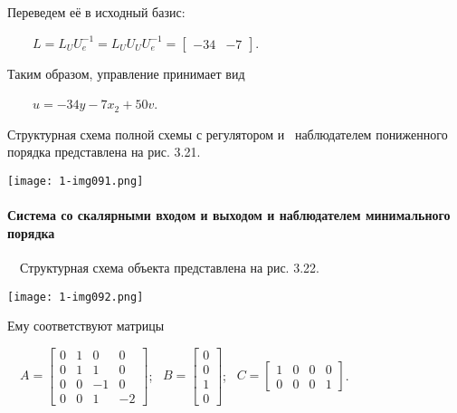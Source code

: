 \documentclass[a4paper]{article}
\begin{document}
{\begin{russian}\sffamily
Переведем её в исходный базис:
\end{russian}}

{\begin{russian}\sffamily
\ \ \ \  $L=L_UU_e^{-1}=L_UU_UU_e^{-1}=\left[\begin{matrix}-34&-7\end{matrix}\right]$.
\end{russian}}

{\begin{russian}\sffamily
Таким образом, управление принимает вид \ 
\end{russian}}

{\begin{russian}\sffamily
\ \ \ \  $u=-34y-7x_2+50v$.
\end{russian}}

{\begin{russian}\sffamily
Структурная схема полной схемы с регулятором и \ наблюдателем пониженного порядка представлена на рис. 3.21.
\end{russian}}

{\centering  \texttt{[image: 1-img091.png]} \par}
\paragraph{Система со скалярными входом и выходом и наблюдателем минимального порядка}

\bigskip

{\begin{russian}\sffamily
\ \ Структурная схема объекта представлена на рис. 3.22.
\end{russian}}


\bigskip

{\centering  \texttt{[image: 1-img092.png]} \par}
{\begin{russian}\sffamily
Ему соответствуют матрицы
\end{russian}}

{\begin{russian}\sffamily
\ \  $A=\left[\begin{matrix}0&1&0&0\\0&1&1&0\\0&0&-1&0\\0&0&1&-2\end{matrix}\right]$; \ 
$B=\left[\begin{matrix}0\\0\\1\\0\end{matrix}\right]$; \  $C=\left[\begin{matrix}1&0&0&0\\0&0&0&1\end{matrix}\right]$.
\end{russian}}
\end{document}
